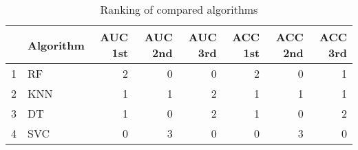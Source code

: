 \begin{table}
\footnotesize
\caption{Ranking of compared algorithms}
\label{tab:places}
\begin{tabular}{llrrrrrr}
\hline
 & Algorithm & AUC 1st & AUC 2nd & AUC 3rd & ACC 1st & ACC 2nd & ACC 3rd \\
\hline
1 & RF & 2 & 0 & 0 & 2 & 0 & 1 \\
2 & KNN & 1 & 1 & 2 & 1 & 1 & 1 \\
3 & DT & 1 & 0 & 2 & 1 & 0 & 2 \\
4 & SVC & 0 & 3 & 0 & 0 & 3 & 0 \\
\hline
\end{tabular}
\end{table}
